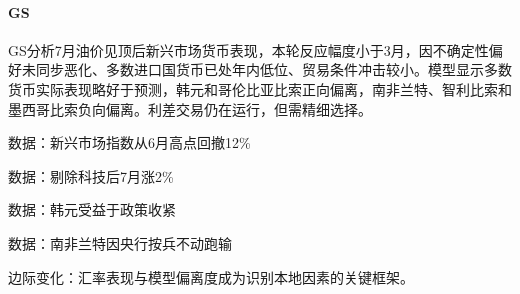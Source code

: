 \documentclass[11pt]{ctexart}
\begin{document}
\paragraph{GS} GS分析7月油价见顶后新兴市场货币表现，本轮反应幅度小于3月，因不确定性偏好未同步恶化、多数进口国货币已处年内低位、贸易条件冲击较小。模型显示多数货币实际表现略好于预测，韩元和哥伦比亚比索正向偏离，南非兰特、智利比索和墨西哥比索负向偏离。利差交易仍在运行，但需精细选择。
{\small\color{refgray}数据：新兴市场指数从6月高点回撤12\%\par}
{\small\color{refgray}数据：剔除科技后7月涨2\%\par}
{\small\color{refgray}数据：韩元受益于政策收紧\par}
{\small\color{refgray}数据：南非兰特因央行按兵不动跑输\par}
{\small\color{refgray}边际变化：汇率表现与模型偏离度成为识别本地因素的关键框架。\par}
\end{document}
